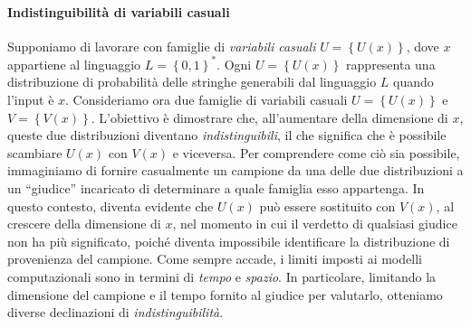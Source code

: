 \documentclass{article}
\theoremstyle{definition}
\begin{document}
\paragraph{Indistinguibilità di variabili casuali}
Supponiamo di lavorare con famiglie di \emph{variabili casuali} $U = \left\{U(x)\right\}$, dove $x$ appartiene al linguaggio $L = \left\{0, 1\right\}^*$.
Ogni $U = \left\{U(x)\right\}$ rappresenta una distribuzione di probabilità delle stringhe generabili dal linguaggio $L$ quando l'input è $x$.
Consideriamo ora due famiglie di variabili casuali $U = \left\{U(x)\right\}$ e $V = \left\{V(x)\right\}$. L'obiettivo è dimostrare che, all'aumentare della dimensione di $x$, queste due distribuzioni diventano \emph{indistinguibili}, il che significa che è possibile scambiare $U(x)$ con $V(x)$ e viceversa.
Per comprendere come ciò sia possibile, immaginiamo di fornire casualmente un campione da una delle due distribuzioni a un ``giudice'' incaricato di determinare a quale famiglia esso appartenga.
In questo contesto, diventa evidente che $U(x)$ può essere sostituito con $V(x)$, al crescere della dimensione di $x$, nel momento in cui il verdetto di qualsiasi giudice non ha più significato, poiché diventa impossibile identificare la distribuzione di provenienza del campione.
Come sempre accade, i limiti imposti ai modelli computazionali sono in termini di \emph{tempo} e \emph{spazio}. In particolare, limitando la dimensione del campione e il tempo fornito al giudice per valutarlo, otteniamo diverse declinazioni di \emph{indistinguibilità}.
\end{document}
